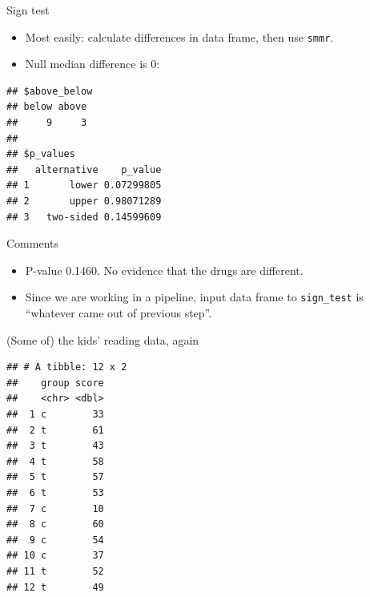 \documentclass[ignorenonframetext,]{beamer}
\newenvironment{Shaded}{\begin{snugshade}}{\end{snugshade}}
\newcommand{\DataTypeTok}[1]{\textcolor[rgb]{0.13,0.29,0.53}{#1}}
\newcommand{\DecValTok}[1]{\textcolor[rgb]{0.00,0.00,0.81}{#1}}
\newcommand{\KeywordTok}[1]{\textcolor[rgb]{0.13,0.29,0.53}{\textbf{#1}}}
\newcommand{\NormalTok}[1]{#1}
\newcommand{\OperatorTok}[1]{\textcolor[rgb]{0.81,0.36,0.00}{\textbf{#1}}}
\newcommand{\StringTok}[1]{\textcolor[rgb]{0.31,0.60,0.02}{#1}}
\providecommand{\tightlist}{%
  \setlength{\itemsep}{0pt}\setlength{\parskip}{0pt}}
\begin{document}
\begin{frame}[fragile]{Sign test}
\protect\hypertarget{sign-test}{}

\begin{itemize}
\tightlist
\item
  Most easily: calculate differences in data frame, then use
  \texttt{smmr}.
\item
  Null median difference is 0:
\end{itemize}

\begin{Shaded}
\end{Shaded}

\begin{verbatim}
## $above_below
## below above 
##     9     3 
## 
## $p_values
##   alternative    p_value
## 1       lower 0.07299805
## 2       upper 0.98071289
## 3   two-sided 0.14599609
\end{verbatim}

\end{frame}

\begin{frame}[fragile]{Comments}
\protect\hypertarget{comments-5}{}

\begin{itemize}
\tightlist
\item
  P-value 0.1460. No evidence that the drugs are different.
\item
  Since we are working in a pipeline, input data frame to
  \texttt{sign\_test} is ``whatever came out of previous step''.
\end{itemize}

\end{frame}

\begin{frame}[fragile]{(Some of) the kids' reading data, again}
\protect\hypertarget{some-of-the-kids-reading-data-again}{}

\begin{Shaded}
\end{Shaded}

\begin{verbatim}
## # A tibble: 12 x 2
##    group score
##    <chr> <dbl>
##  1 c        33
##  2 t        61
##  3 t        43
##  4 t        58
##  5 t        57
##  6 t        53
##  7 c        10
##  8 c        60
##  9 c        54
## 10 c        37
## 11 t        52
## 12 t        49
\end{verbatim}

\end{frame}
\end{document}
